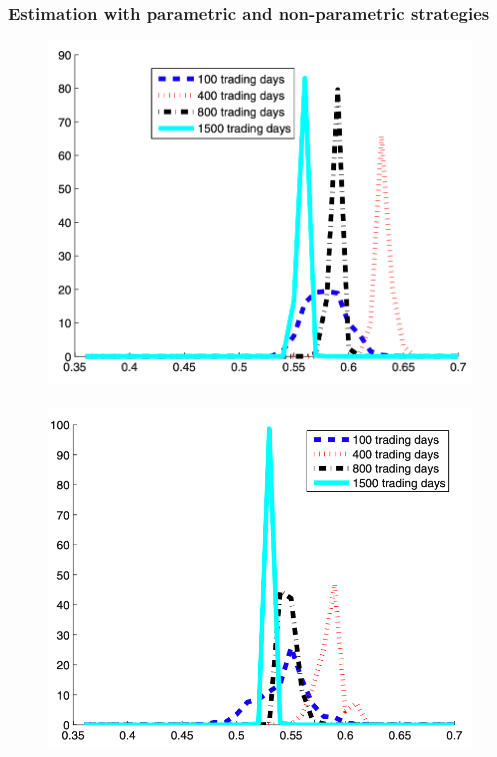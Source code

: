 \documentclass[10pt]{beamer}
\begin{document}

\begin{frame}[c]\frametitle{Estimation with parametric and non-parametric strategies}
	\begin{figure} \centering
		\includegraphics[scale=.11]{figures/grazzini_2017_gaussian.png} ~
		\includegraphics[scale=.11]{figures/grazzini_2017_grid.png} ~

\end{figure}
\end{frame}
\end{document}
